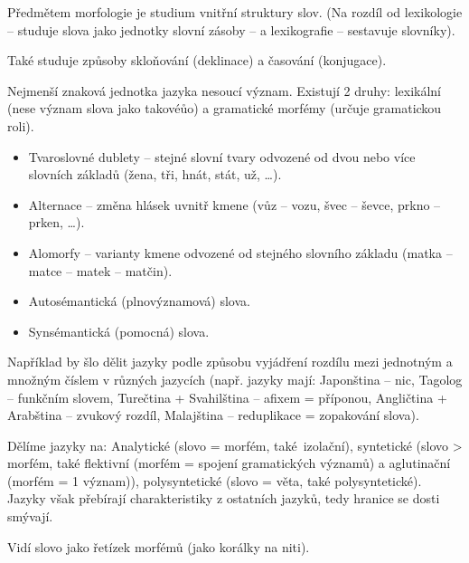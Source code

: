 \documentclass[12pt]{article}					%
\begin{document}
\begin{poznamka}
	Předmětem morfologie je studium vnitřní struktury slov. (Na rozdíl od lexikologie – studuje slova jako jednotky slovní zásoby – a lexikografie – sestavuje slovníky).

	Také studuje způsoby skloňování (deklinace) a časování (konjugace).
\end{poznamka}

\begin{definice}[Morfém]
	Nejmenší znaková jednotka jazyka nesoucí význam. Existují 2 druhy: lexikální (nese význam slova jako takovéůo) a gramatické morfémy (určuje gramatickou roli).
\end{definice}

\begin{definice}
	\begin{itemize}
		\item Tvaroslovné dublety – stejné slovní tvary odvozené od dvou nebo více slovních základů (žena, tři, hnát, stát, už, …).
		\item Alternace – změna hlásek uvnitř kmene (vůz – vozu, švec – ševce, prkno – prken, …).
		\item Alomorfy – varianty kmene odvozené od stejného slovního základu (matka – matce – matek – matčin).
		\item Autosémantická (plnovýznamová) slova.
		\item Synsémantická (pomocná) slova.
	\end{itemize}
\end{definice}

\begin{poznamka}
	Například by šlo dělit jazyky podle způsobu vyjádření rozdílu mezi jednotným a množným číslem v různých jazycích (např. jazyky mají: Japonština – nic, Tagolog – funkčním slovem, Turečtina + Svahilština – afixem = příponou, Angličtina + Arabština – zvukový rozdíl, Malajština – reduplikace = zopakování slova).

	Dělíme jazyky na: Analytické (slovo = morfém, také izolační), syntetické (slovo > morfém, také flektivní (morfém = spojení gramatických významů) a aglutinační (morfém = 1 význam)), polysyntetické (slovo = věta, také polysyntetické). Jazyky však přebírají charakteristiky z ostatních jazyků, tedy hranice se dosti smývají.
\end{poznamka}

\begin{definice}
	Vidí slovo jako řetízek morfémů (jako korálky na niti).
\end{definice}
\end{document}
